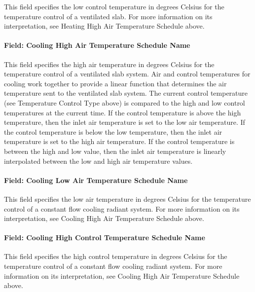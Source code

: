 This field specifies the low control temperature in degrees Celsius for the temperature control of a ventilated slab. For more information on its interpretation, see Heating High Air Temperature Schedule above.

\paragraph{Field: Cooling High Air Temperature Schedule Name}\label{field-cooling-high-air-temperature-schedule-name}

This field specifies the high air temperature in degrees Celsius for the temperature control of a ventilated slab system. Air and control temperatures for cooling work together to provide a linear function that determines the air temperature sent to the ventilated slab system. The current control temperature (see Temperature Control Type above) is compared to the high and low control temperatures at the current time. If the control temperature is above the high temperature, then the inlet air temperature is set to the low air temperature. If the control temperature is below the low temperature, then the inlet air temperature is set to the high air temperature. If the control temperature is between the high and low value, then the inlet air temperature is linearly interpolated between the low and high air temperature values.

\paragraph{Field: Cooling Low Air Temperature Schedule Name}\label{field-cooling-low-air-temperature-schedule-name}

This field specifies the low air temperature in degrees Celsius for the temperature control of a constant flow cooling radiant system. For more information on its interpretation, see Cooling High Air Temperature Schedule above.

\paragraph{Field: Cooling High Control Temperature Schedule Name}\label{field-cooling-high-control-temperature-schedule-name-1}

This field specifies the high control temperature in degrees Celsius for the temperature control of a constant flow cooling radiant system. For more information on its interpretation, see Cooling High Air Temperature Schedule above.

